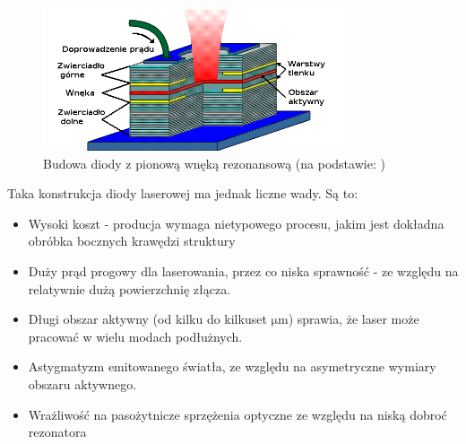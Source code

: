 \documentclass[a4paper,10pt]{article}
\begin{document}
\begin{figure}
\begin{center}
 \includegraphics[width=0.8\textwidth]{./obrazki/rys-vcsel.png}
\end{center}
\caption{Budowa diody z pionową wnęką rezonansową (na podstawie: \cite{rys-laserki})}
\label{rys-vcsel}
\end{figure}

Taka konstrukcja diody laserowej ma jednak liczne wady. Są to:
\begin{itemize}
 \item Wysoki koszt - producja wymaga nietypowego procesu, jakim jest dokładna obróbka bocznych krawędzi struktury
 \item Duży prąd progowy dla laserowania, przez co niska sprawność - ze względu na relatywnie dużą powierzchnię złącza.
 \item Długi obszar aktywny (od kilku do kilkuset $\mathrm{\mu m}$) sprawia, że laser może pracować w wielu modach podłużnych.
 \item Astygmatyzm emitowanego światła, ze względu na asymetryczne wymiary obszaru aktywnego.
 \item Wrażliwość na pasożytnicze sprzężenia optyczne ze względu na niską dobroć rezonatora
\end{itemize}
\end{document}
